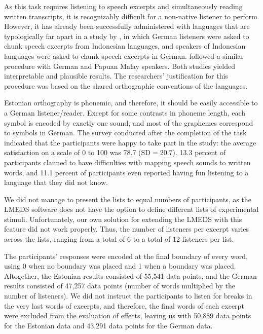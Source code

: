 \documentclass[output=paper]{langscibook}
\begin{document}
    As this task requires listening to speech excerpts and simultaneously reading written transcripts, it is recognizably difficult for a non-native listener to perform. However, it has already been successfully administered with languages that are typologically far apart in a study by \citet[][]{himmelmannEtAl2018}, in which German listeners were asked to chunk speech excerpts from Indonesian languages, and speakers of Indonesian languages were asked to chunk speech excerpts in German. \citet[][]{riesbergEtAl2020} followed a similar procedure with German and Papuan Malay speakers. Both studies yielded interpretable and plausible results. The researchers’ justification for this procedure was based on the shared orthographic conventions of the languages. 

    Estonian orthography is phonemic, and therefore, it should be easily accessible to a German listener/reader. Except for some contrasts in phoneme length, each symbol is encoded by exactly one sound, and most of the graphemes correspond to symbols in German. The survey conducted after the completion of the task indicated that the participants were happy to take part in the study: the average satisfaction on a scale of 0 to 100 was 78.7 ($\text{SD}=20.7$). 13.3 percent of participants claimed to have difficulties with mapping speech sounds to written words, and 11.1 percent of participants even reported having fun listening to a language that they did not know.\largerpage[2]

    We did not manage to present the lists to equal numbers of participants, as the LMEDS software does not have the option to define different lists of experimental stimuli. Unfortunately, our own solution for extending the LMEDS with this feature did not work properly. Thus, the number of listeners per excerpt varies across the lists, ranging from a total of 6 to a total of 12 listeners per list.
    
    The participants’ responses were encoded at the final boundary of every word, using 0 when no boundary was placed and 1 when a boundary was placed. Altogether, the Estonian results consisted of 55,541 data points, and the German results consisted of 47,257 data points (number of words multiplied by the number of listeners). We did not instruct the participants to listen for breaks in the very last words of excerpts, and therefore, the final words of each excerpt were excluded from the evaluation of effects, leaving us with 50,889 data points for the Estonian data and 43,291 data points for the German data.  
    
\end{document}
